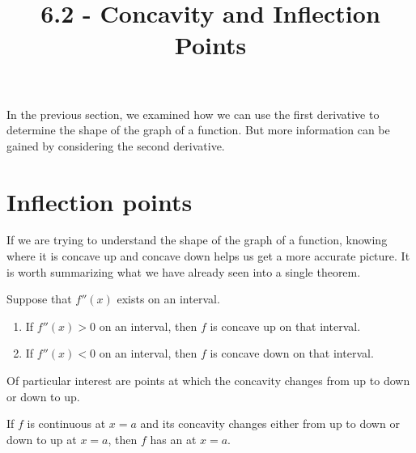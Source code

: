 \documentclass{ximera}
\title{6.2 - Concavity and Inflection Points}
\begin{document}
\begin{abstract} \end{abstract}
\maketitle
In the previous section, we examined how we can use the first derivative to determine the shape of the graph of a function. But more information can be gained by considering the second derivative. 

\section{Inflection points}

If we are trying to understand the shape of the graph of a function,
knowing where it is concave up and concave down helps us  get a more
accurate picture. It is worth summarizing what we have already seen into
 a single theorem.

\begin{theorem}
Suppose that $f''(x)$ exists on an interval.
\begin{enumerate}
\item If $f''(x)>0$ on an interval, then $f$ is concave up on that interval.
\item If $f''(x)<0$ on an interval, then $f$ is concave down on that interval.
\end{enumerate}
\end{theorem}


Of particular interest are points at which the concavity changes from
up to down or down to up. 

\begin{definition}
If $f$ is continuous at $x=a$ and its concavity changes either from up to down
or down to up at $x=a$, then $f$ has an  at
$x=a$.
\end{definition}
\end{document}
